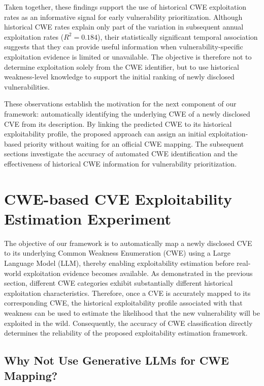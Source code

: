 \documentclass[conference,compsoc]{IEEEtran}
\begin{document}
Taken together, these findings support the use
of historical CWE exploitation rates as an
informative signal for early vulnerability
prioritization. Although historical CWE rates
explain only part of the variation in subsequent
annual exploitation rates ($R^2=0.184$),
their statistically significant temporal
association suggests that they can provide
useful information when vulnerability-specific
exploitation evidence is limited or unavailable.
The objective is therefore not to determine
exploitation solely from the CWE identifier,
but to use historical weakness-level knowledge
to support the initial ranking of newly
disclosed vulnerabilities.

These observations establish the motivation
for the next component of our framework:
automatically identifying the underlying CWE
of a newly disclosed CVE from its description.
By linking the predicted CWE to its historical
exploitability profile, the proposed approach
can assign an initial exploitation-based
priority without waiting for an official CWE
mapping. The subsequent sections investigate
the accuracy of automated CWE identification
and the effectiveness of historical CWE
information for vulnerability prioritization.



\section{CWE-based CVE Exploitability Estimation Experiment}

The objective of our framework is to automatically map a newly disclosed CVE to its underlying Common Weakness Enumeration (CWE) using a Large Language Model (LLM), thereby enabling exploitability estimation before real-world exploitation evidence becomes available. As demonstrated in the previous section, different CWE categories exhibit substantially different historical exploitation characteristics. Therefore, once a CVE is accurately mapped to its corresponding CWE, the historical exploitability profile associated with that weakness can be used to estimate the likelihood that the new vulnerability will be exploited in the wild. Consequently, the accuracy of CWE classification directly determines the reliability of the proposed exploitability estimation framework.





\subsection{Why Not Use Generative LLMs for CWE Mapping?}
\label{subsec:generative_llm_limitations}
\end{document}
